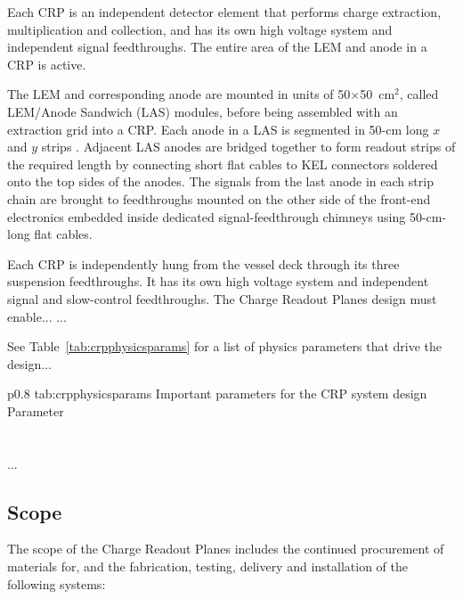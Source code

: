 Each CRP is an independent detector element that performs charge
extraction, multiplication and collection, and has its own high
voltage system and independent signal feedthroughs. The entire area of
the LEM and anode in a CRP is active.

The LEM and corresponding anode are mounted in units of 50$\times$50~cm$^2$, called
LEM/Anode Sandwich (LAS) modules, before being assembled with an extraction
grid into a CRP. Each
anode in a LAS is segmented in 50-cm long $x$ and $y$ strips . Adjacent LAS anodes
are bridged together to form readout strips of the required length by
connecting short flat cables to KEL connectors soldered onto the top
sides of the anodes. The signals from the last anode in each 
strip chain are brought to feedthroughs
mounted on the other side of the front-end electronics embedded inside
dedicated signal-feedthrough chimneys using 50-cm-long flat cables.


Each CRP is independently hung from the vessel deck through its three
suspension feedthroughs. It has its own high voltage system and 
independent signal and slow-control feedthroughs.
The Charge Readout Planes design must enable... 
...


See Table~\ref{tab:crpphysicsparams} for a list of physics parameters that drive the design...

\begin{dunetable}
{p{0.8\textwidth}}
{tab:crpphysicsparams}
{Important parameters for the CRP system design}   
Parameter \\ \toprowrule
  \\ \colhline
   \\ \colhline
 ...\\ 
\end{dunetable}



\subsection{Scope}
\label{sec:fddp-crp-scope}

The scope of the Charge Readout Planes includes the continued procurement of materials for, and the fabrication, testing, delivery and installation of the following systems: 

